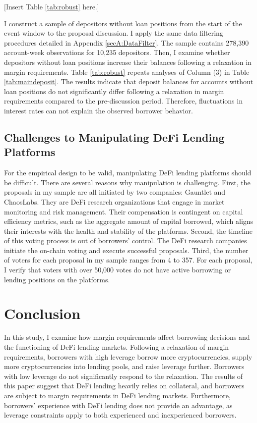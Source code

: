 \documentclass[12pt]{article}
\begin{document}
\centerline{[Insert Table \ref{tab:robust} here.]}


I construct a sample of depositors without loan positions from the start of the event window to the proposal discussion. I apply the same data filtering procedures detailed in Appendix \ref{secA:DataFilter}. The sample contains 278,390 account-week observations for 10,235 depositors. Then, I examine whether depositors without loan positions increase their balances following a relaxation in margin requirements. Table \ref{tab:robust} repeats analyses of Column (3) in Table \ref{tab:maindeposit}. The results indicate that deposit balances for accounts without loan positions do not significantly differ following a relaxation in margin requirements compared to the pre-discussion period. Therefore, fluctuations in interest rates can not explain the observed borrower behavior.

\subsection{Challenges to Manipulating DeFi Lending Platforms}

For the empirical design to be valid, manipulating DeFi lending platforms should be difficult. There are several reasons why manipulation is challenging. First, the proposals in my sample are all initiated by two companies: Gauntlet and ChaosLabs. They are DeFi research organizations that engage in market monitoring and risk management. Their compensation is contingent on capital efficiency metrics, such as the aggregate amount of capital borrowed, which aligns their interests with the health and stability of the platforms. Second, the timeline of this voting process is out of borrowers' control. The DeFi research companies initiate the on-chain voting and execute successful proposals. Third, the number of voters for each proposal in my sample ranges from 4 to 357. For each proposal, I verify that voters with over 50,000 votes do not have active borrowing or lending positions on the platforms.

 
\section{Conclusion}\label{sec:conclude}

In this study, I examine how margin requirements affect borrowing decisions and the functioning of DeFi lending markets. Following a relaxation of margin requirements, borrowers with high leverage borrow more cryptocurrencies, supply more cryptocurrencies into lending pools, and raise leverage further. Borrowers with low leverage do not significantly respond to the relaxation. The results of this paper suggest that DeFi lending heavily relies on collateral, and borrowers are subject to margin requirements in DeFi lending markets. Furthermore, borrowers' experience with DeFi lending does not provide an advantage, as leverage constraints apply to both experienced and inexperienced borrowers.
\end{document}
